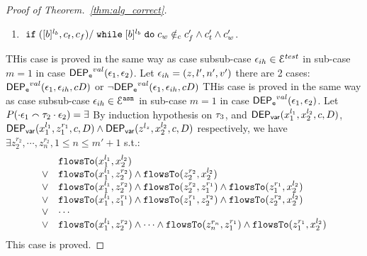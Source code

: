 \begin{proof}[Proof of Theorem.~\ref{thm:alg_correct}]
\begin{enumerate}
 By definition of environment, we have:
\[
  \forall u \in \lvar_c \setminus \{x_1^{l_1}\} \st
  \env(\vtrace_0 \vtrace_1 \cdot \event_1') (u) =  
  \env(\vtrace_0 \vtrace_1 \cdot \event_1) (u)
\]
%
By {Inversion Lemma~\ref{lem:inv_b}} of boolean expression evaluation on $b'$, we have:
 \[
  x_1 \in VAR(b')
 \]
 We also have 
 $$
 \llabel(\vtrace_0 \vtrace_1 \cdot \event_1') x_1 = l_1
 \land 
 \llabel(\vtrace_0 \vtrace_1 \cdot \event_1') x_1 = l_1
 $$
 Then, we know:
 \[
 \flowsto(x_1^{l_1}, x_2^{l2})
 \]
 This case is proved.
\item $\;\mathtt{if}\;([b]{}^{l_b}, c_t, c_f) / \;\mathtt{while}\; [b]{}^{l_b} \;\mathtt{do}\; c_w \notin_c c_f' \land c_t' \land c_w'$.

\end{enumerate}
%
THis case is proved in the same way as case subsub-case $\mathtt{\epsilon}_{ih} \in \mathcal{E}^{test}$ in sub-case $m = 1$ in case $\mathsf{DEP_{\mathtt{e}}}^{val}(\mathtt{\epsilon}_1, \mathtt{\epsilon}_2)$.
%
Let $\mathtt{\epsilon}_{ih} = (z, l', n', v')$  there are 2 cases:
$\mathsf{DEP_{\mathtt{e}}}^{val}(\mathtt{\epsilon}_1, \mathtt{\epsilon}_{ih}, c D)$ or $\neg \mathsf{DEP_{\mathtt{e}}}^{val}(\mathtt{\epsilon}_1, \mathtt{\epsilon}_{ih}, c D)$
%
%
THis case is proved in the same way as case subsub-case $\mathtt{\epsilon}_{ih} \in \mathcal{E}^{\mathtt{{asn}}}$ in sub-case $m = 1$ in case $\mathsf{DEP_{\mathtt{e}}}^{val}(\mathtt{\epsilon}_1, \mathtt{\epsilon}_2)$.
%
Let $P(\cdot \mathtt{\epsilon}_1 \smallfrown \mathtt{\tau}_2 \cdot \mathtt{\epsilon}_2) = \exists$
By induction hypothesis on $\mathtt{\tau}_3$,
 and $\mathsf{DEP_{var}}(x_1^{l_1}, x_2^{l_2}, c, D)$, 
$\mathsf{DEP_{var}}(x_1^{l_1}, z_1^{r_1}, c, D) \land \mathsf{DEP_{var}}(z^{l_z}, x_2^{l_2}, c, D)$ respectively, 
we have $\exists z_2^{r_2}, \cdots, z_n^{r_2}, 1 \leq n \leq m'+1$ s.t.:
\[
\begin{array}{ll}
      & \mathtt{flowsTo}(x_1^{l_1}, x_2^{l_2}) \\
  \lor  & \mathtt{flowsTo}(x_1^{l_1}, z_2^{r_2}) \land \mathtt{flowsTo}(z_2^{r_2}, x_2^{l_2})\\
  \lor  & \mathtt{flowsTo}(x_1^{l_1}, z_2^{r_2}) \land \mathtt{flowsTo}(z_2^{r_2}, z_1^{r_1}) \land \mathtt{flowsTo}(z_1^{r_1}, x_2^{l_2}) \\
  \lor  & \mathtt{flowsTo}(x_1^{l_1}, z_1^{r_1}) \land \mathtt{flowsTo}(z_1^{r_1}, z_2^{r_2}) \land \mathtt{flowsTo}(z_2^{r_2}, x_2^{l_2}) \\
  \lor  & \cdots \\
  \lor  & \mathtt{flowsTo}(x_1^{l_1}, z_2^{r_2}) \land \cdots \land \mathtt{flowsTo}(z_n^{r_n}, z_1^{r_1}) \land \mathtt{flowsTo}(z_1^{r_1}, x_2^{l_2}) \\
\end{array}
\]This case is proved.
\end{proof}